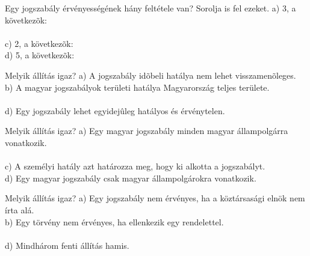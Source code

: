 \begin{frame}

\begin{tcolorbox}[title={25. Kérdés}]
Egy jogszabály érvényességének hány feltétele van? Sorolja is fel ezeket.
\tcblower
a) 3, a következõk:\\
\\
c) 2, a következõk:\\
d) 5, a következõk:
\end{tcolorbox}

\begin{tcolorbox}[title={26. Kérdés}]
Melyik állítás igaz?
\tcblower
a) A jogszabály idõbeli hatálya nem lehet visszamenõleges.\\
b) A magyar jogszabályok területi hatálya Magyarország teljes területe.\\
\\
d) Egy jogszabály lehet egyidejûleg hatályos és érvénytelen.
\end{tcolorbox}

\begin{tcolorbox}[title={27. Kérdés}]
Melyik állítás igaz?
\tcblower
a) Egy magyar jogszabály minden magyar állampolgárra vonatkozik.\\
\\
c) A személyi hatály azt határozza meg, hogy ki alkotta a jogszabályt.\\
d) Egy magyar jogszabály csak magyar állampolgárokra vonatkozik.
\end{tcolorbox}

\begin{tcolorbox}[title={28. Kérdés}]
Melyik állítás igaz?
\tcblower
a) Egy jogszabály nem érvényes, ha a köztársasági elnök nem írta alá.\\
b) Egy törvény nem érvényes, ha ellenkezik egy rendelettel.\\
\\
d) Mindhárom fenti állítás hamis.
\end{tcolorbox}

\end{frame}


